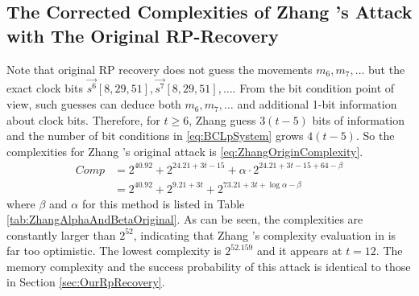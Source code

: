 \subsection{The Corrected Complexities of Zhang \etal's Attack with The Original RP-Recovery}\label{sec:ZhangRpRecovery}
Note that original RP recovery does not guess the movements $m_6,m_7,\ldots$ but the exact clock bits $\vec{s^6}[8,29,51], \vec{s^7}[8,29,51],\ldots$.
From the bit condition point of view, such guesses can deduce both $m_6,m_7,\ldots$ and additional 1-bit information about clock bits.
Therefore, for $t\geq 6$, Zhang \etal guess $3(t-5)$ bits of information and the number of bit conditions in \eqref{eq:BCLpSystem} grows $4(t-5)$. 
So the complexities for Zhang \etal's original attack is \eqref{eq:ZhangOriginComplexity}.
\begin{equation}\label{eq:ZhangOriginComplexity}
\begin{aligned}
Comp&=2^{40.92}+2^{24.21+3t-15}+\alpha \cdot 2^{24.21+3t-15+64-\beta}\\
&=2^{40.92}+2^{9.21+3t}+2^{73.21+3t+\log \alpha -\beta}
\end{aligned}
\end{equation}
where $\beta$ and $\alpha$ for this method is listed in Table \ref{tab:ZhangAlphaAndBetaOriginal}.
As can be seen, the complexities are constantly larger than $2^{52}$, indicating that Zhang \etal's complexity evaluation in \cite{AC:Zhang19} is far too optimistic. 
The lowest complexity is $2^{52.159}$ and it appears at $t=12$. 
The memory complexity and the success probability of this attack is identical to those in  Section \ref{sec:OurRpRecovery}.

